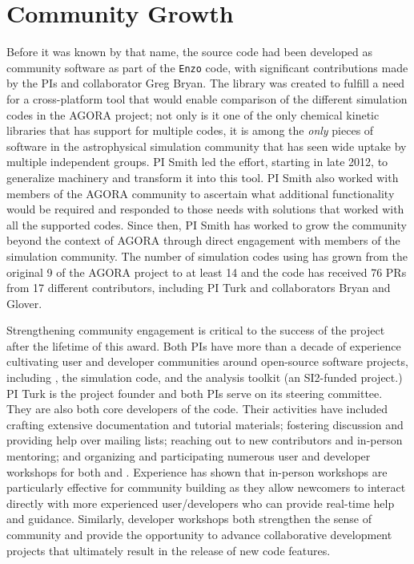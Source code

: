 \section{Community Growth}\label{sec:community_growth}

Before it was known by that name, the \grackle{} source code had
been developed as community software as part of the \texttt{Enzo}
code, with significant contributions made by the PIs and collaborator
Greg Bryan.  The \grackle{} library was created to fulfill a need
for a cross-platform tool that would enable comparison of the
different simulation codes in the AGORA project; not only is it one of the only
chemical kinetic libraries that has support for multiple codes, it is among the
\textit{only} pieces of software in the astrophysical simulation community that
has seen wide uptake by multiple independent groups.  PI Smith led the
effort, starting in late 2012, to generalize  machinery
and transform it into this tool.  PI Smith also worked with members of
the AGORA community to ascertain what additional functionality would be
required and responded to those needs with solutions that worked with
all the supported codes.  Since then, PI Smith has worked to grow the
\grackle{} community beyond the context of AGORA through direct
engagement with members of the simulation community.  The number of
simulation codes using \grackle{} has grown from the original 9 of the
AGORA project to at least 14 and the code has received 76 PRs from 17
different contributors, including PI Turk and collaborators Bryan and
Glover.

Strengthening community engagement is critical to the success of the
\grackle{} project after the lifetime of this award.  Both PIs
have more than a decade of experience cultivating user and developer
communities around open-source software projects, including
\grackle{}, the \enzo{} simulation code, and the \yt{} analysis
toolkit (an SI2-funded project.)  PI Turk is the \yt{} project founder
and both PIs serve on its steering committee.  They are also both core
developers of the \enzo{} code.  Their activities have included
crafting extensive documentation and tutorial materials; fostering
discussion and providing help over mailing lists; reaching out to new
contributors and in-person mentoring; and organizing and participating
numerous user and developer workshops for both \enzo{} and \yt{}.
Experience has shown that in-person workshops are particularly
effective for community building as they allow newcomers to interact
directly with more experienced user/developers who can provide
real-time help and guidance.  Similarly, developer workshops both
strengthen the sense of community and provide the opportunity to
advance collaborative development projects that ultimately result in
the release of new code features.

